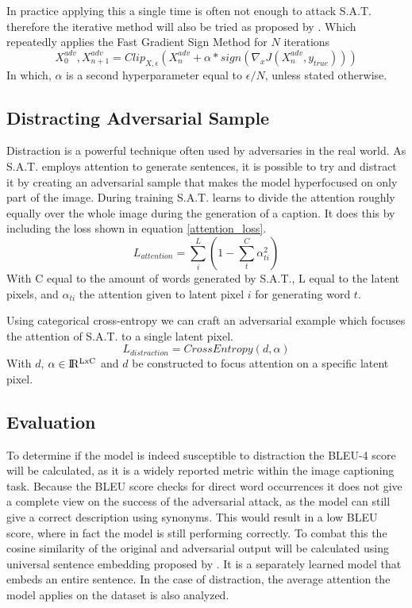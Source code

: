 In practice applying this a single time is often not enough to attack S.A.T. therefore the iterative method will also be tried as proposed by \citeauthor{Kurakin}. Which repeatedly applies the Fast Gradient Sign Method for $N$ iterations
\begin{equation}
    X^{adv}_{0}, X^{adv}_{n + 1} = Clip_{X, \epsilon}(X^{adv}_{n} + \alpha * sign(\nabla_{x}J(X^{adv}_{n}, y_{true})))
    \label{IterativeMethod}
\end{equation}
In which, $\alpha$ is a second hyperparameter equal to $\epsilon / N$, unless stated otherwise.

\subsection*{Distracting Adversarial Sample}
Distraction is a powerful technique often used by adversaries in the real world. As S.A.T. employs attention to generate sentences, it is possible to try and distract it by creating an adversarial sample that makes the model hyperfocused on only part of the image. During training S.A.T. learns to divide the attention roughly equally over the whole image during the generation of a caption. It does this by including the loss shown in equation \ref{attention_loss}.
\begin{equation}
    L_{attention} = \sum^{L}_i (1 - \sum^{C}_{t} \alpha_{ti}^2)
    \label{attention_loss}
\end{equation}
\noindent With C equal to the amount of words generated by S.A.T., L equal to the latent pixels, and $\alpha_{ti}$ the attention given to latent pixel $i$ for generating word $t$.

Using categorical cross-entropy we can craft an adversarial example which focuses the attention of S.A.T. to a single latent pixel.
\begin{equation}
    L_{distraction} = CrossEntropy(d, \alpha)
    \label{distraction_loss}
\end{equation}
With $d$, $\alpha \in \rm I\!R^{LxC}$ and $d$ be constructed to focus attention on a specific latent pixel.

\subsection{Evaluation}
To determine if the model is indeed susceptible to distraction the BLEU-4 score \cite{papineni_roukos_ward_zhu_2001} will be calculated, as it is a widely reported metric within the image captioning task. Because the BLEU score checks for direct word occurrences it does not give a complete view on the success of the adversarial attack, as the model can still give a correct description using synonyms. This would result in a low BLEU score, where in fact the model is still performing correctly. To combat this the cosine similarity of the original and adversarial output will be calculated using universal sentence embedding proposed by \citeauthor{DBLP:journals/corr/abs-1803-11175}. It is a separately learned model that embeds an entire sentence.
In the case of distraction, the average attention the model applies on the dataset is also analyzed.
